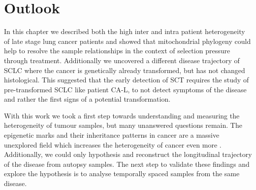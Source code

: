 \section{Outlook}
\label{cascade-sec:outlook}

In this chapter we described both the high inter and intra patient heterogeneity of late stage lung cancer patients and showed that mitochondrial phylogeny could help to resolve the sample relationships in the context of selection pressure through treatment. Additionally we uncovered a different disease trajectory of SCLC where the cancer is genetically already transformed, but has not changed histological. This suggested that the early detection of SCT requires the study of pre-transformed SCLC like patient CA-L, to not detect symptoms of the disease and rather the first signs of a potential transformation.

With this work we took a first step towards understanding and measuring the heterogeneity of tumour samples, but many unanswered questions remain. The epigenetic marks and their inheritance patterns in cancer are a massive unexplored field which increases the heterogeneity of cancer even more \cite{Easwaran2014}. Additionally, we could only hypothesis and reconstruct the longitudinal trajectory of the disease from autopsy samples. The next step to validate these findings and explore the hypothesis is to analyse temporally spaced samples from the same disease.
